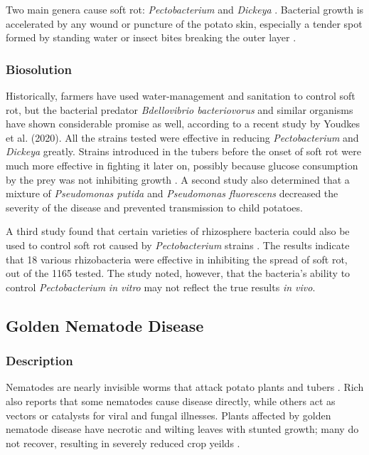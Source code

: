 \documentclass[12pt]{article}
\begin{document}
Two main genera cause soft rot: \emph{Pectobacterium} and \emph{Dickeya} \autocite{youdkes2020potential}. Bacterial growth is accelerated by any wound or puncture of the potato skin, especially a tender spot formed by standing water or insect bites breaking the outer layer \autocite{rich2013potato}.

\subsubsection{Biosolution}

Historically, farmers have used water-management and sanitation to control soft rot, but the bacterial predator \emph{Bdellovibrio bacteriovorus} and similar organisms have shown considerable promise as well, according to a recent study by Youdkes et al. (2020). All the strains tested were effective in reducing \emph{Pectobacterium} and \emph{Dickeya} greatly. Strains introduced in the tubers before the onset of soft rot were much more effective in fighting it later on, possibly because glucose consumption by the prey was not inhibiting growth \autocite{youdkes2020potential}. A second study also determined that a mixture of \emph{Pseudomonas putida} and \emph{Pseudomonas fluorescens} decreased the severity of the disease and prevented transmission to child potatoes.

A third study found that certain varieties of rhizosphere bacteria could also be used to control soft rot caused by \emph{Pectobacterium} strains \autocite{krzyzanowska2012rhizosphere}. The results indicate that 18 various rhizobacteria were effective in inhibiting the spread of soft rot, out of the 1165 tested. The study noted, however, that the bacteria's ability to control \emph{Pectobacterium} \emph{in vitro} may not reflect the true results \emph{in vivo}.

\subsection{Golden Nematode Disease}
\subsubsection{Description}

Nematodes are nearly invisible worms that attack potato plants and tubers \autocite{rich2013potato}. Rich also reports that some nematodes cause disease directly, while others act as vectors or catalysts for viral and fungal illnesses. Plants affected by golden nematode disease have necrotic and wilting leaves with stunted growth; many do not recover, resulting in severely reduced crop yeilds \autocite{rich2013potato}.
\end{document}
